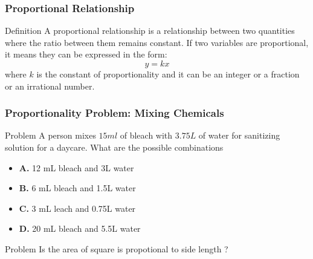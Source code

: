 \documentclass{beamer}
\begin{document}
\begin{frame}
    \frametitle{Proportional Relationship}

    \begin{block}{Definition}
        A proportional relationship is a relationship between two quantities where the ratio between them remains constant. 
        If two variables are proportional, it means they can be expressed in the form:
        \[ y = kx \]
        where $ k $ is the constant of proportionality and it can be an integer or a fraction or an irrational number.
    \end{block}
\end{frame}

\begin{frame}
    \frametitle{Proportionality Problem: Mixing Chemicals}

    \begin{block}{Problem}
        A person mixes $15 ml$ of bleach with $3.75 L$ of water for sanitizing solution for a daycare. What are the possible combinations 
    \end{block}

    \begin{itemize}
        \item \textbf{A.} 12 mL bleach and 3L water
        \item \textbf{B.} 6 mL bleach and 1.5L water
        \item \textbf{C.} 3 mL leach and 0.75L water
        \item \textbf{D.} 20 mL bleach and 5.5L water
    \end{itemize}
    \begin{block}{Problem}
        Is the area of square is propotional to side length ?
    \end{block}
\end{frame}
\end{document}
